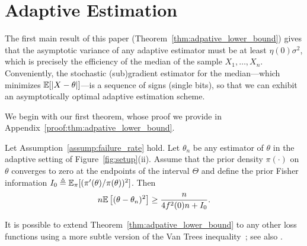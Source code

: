 \section{Adaptive Estimation \label{sec:sequential}}

The first main result of this paper (Theorem~\ref{thm:adpative_lower_bound})
gives that the asymptotic variance of any adaptive estimator must be at
least $\eta(0)\sigma^2$, which is precisely the efficiency of the median of
the sample $X_1,\ldots,X_n$. Conveniently, the stochastic (sub)gradient
estimator for the median---which minimizes $\mathbb{E}[|X - \theta|]$---is a
sequence of signs (single bits), so that we can exhibit an asymptotically
optimal adaptive estimation scheme.


We begin with our first theorem, whose proof we provide in
Appendix~\ref{proof:thm:adpative_lower_bound}.
\begin{thm}\label{thm:adpative_lower_bound}
  Let Assumption~\ref{assump:failure_rate} hold.
  Let ${\theta}_n$ be any estimator of $\theta$ in the adaptive setting of
  Figure~\ref{fig:setup}(ii). Assume that the prior
  density $\pi(\cdot)$ on $\theta$ converges to zero
  at the endpoints of the interval $\Theta$ and
  define the prior Fisher information
  $I_0 \triangleq \mathbb{E}_\pi[(\pi'(\theta) / \pi(\theta))^2]$.
  Then
  \begin{equation*}
    n \mathbb{E}\left[ (\theta-{\theta}_n)^2 \right] \geq   \frac{n}{ 4f^2(0) n + I_0}.
  \end{equation*}
\end{thm}


It is possible to extend Theorem~\ref{thm:adpative_lower_bound} to any other
loss functions using a more subtle version of the Van Trees
inequality~\cite{efroimovich1980information}; see also
\cite{DBLP:journals/corr/abs-1902-08582}.


